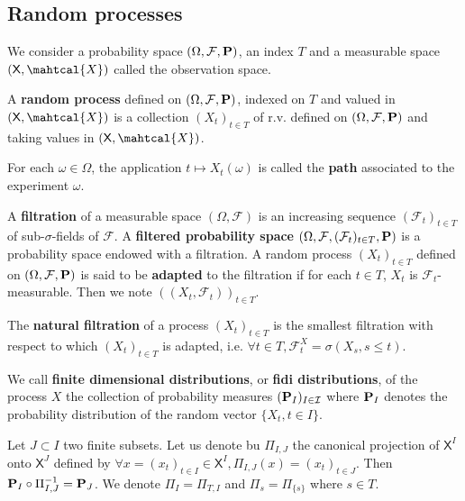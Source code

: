 \subsection{Random processes}

	We consider a probability space $(\Omega, \mathcal{F}, \mathbf{P})$, an index $T$ and a measurable space $(\mathsf{X}, \mahtcal{X})$ called the observation space.

	\begin{defn}
		A \textbf{random process} defined on $(\Omega, \mathcal{F}, \mathbf{P})$, indexed on $T$ and valued in $(\mathsf{X}, \mahtcal{X})$ is a collection $(X_t)_{t \in T}$ of r.v. defined on $(\Omega, \mathcal{F}, \mathbf{P})$ and taking values in $(\mathsf{X}, \mahtcal{X})$.
	\end{defn}

	\begin{defn}
		For each $\omega \in \Omega$, the application $t \mapsto X_t(\omega)$ is called the \textbf{path} associated to the experiment $\omega$.
	\end{defn}

	\begin{defn}
		A \textbf{filtration} of a measurable space $(\Omega, \mathcal{F})$ is an increasing sequence $(\mathcal{F}_t)_{t \in T}$ of sub-$\sigma$-fields of $\mathcal{F}$.
		A \textbf{filtered probability space} $(\Omega, \mathcal{F}, (\mathcal{F}_t)_{t \in T}, \mathbf{P})$ is a probability space endowed with a filtration.
		A random process $(X_t)_{t \in T}$ defined on $(\Omega, \mathcal{F}, \mathbf{P})$ is said to be \textbf{adapted} to the filtration if for each $t \in T$, $X_t$ is $\mathcal{F}_t$-measurable.
		Then we note $((X_t, \mathcal{F}_t))_{t \in T}$.
	\end{defn}

	\begin{defn}
		The \textbf{natural filtration} of a process $(X_t)_{t \in T}$ is the smallest filtration with respect to which $(X_t)_{t \in T}$ is adapted, i.e. $\forall t \in T, \mathcal{F}_t^X = \sigma(X_s, s \leq t)$.
	\end{defn}

	\begin{defn}
		We call \textbf{finite dimensional distributions}, or \textbf{fidi distributions}, of the process $X$ the collection of probability measures $(\mathbf{P}_I)_{I \in \mathcal{I}}$ where $\mathbf{P}_I$ denotes the probability distribution of the random vector $\{ X_t, t \in I \}$.
	\end{defn}

	Let $J \subset I$ two finite subsets.
	Let us denote bu $\Pi_{I,J}$ the canonical projection of $\mathsf{X}^I$ onto $\mathsf{X}^J$ defined by $\forall x = (x_t)_{t \in I} \in \mathsf{X}^I, \Pi_{I,J}(x) = (x_t)_{t \in J}$.
	Then $\mathbf{P}_I \circ \Pi_{I,J}^{-1} = \mathbf{P}_J$.
	We denote $\Pi_I = \Pi_{T,I}$ and $\Pi_s = \Pi_{ \{ s \} }$ where $s \in T$.
